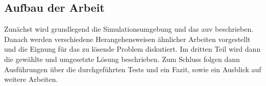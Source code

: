 \subsection{Aufbau der Arbeit}
Zunächst wird grundlegend die Simulationsumgebung und das \gls{auv} beschrieben. Danach werden verschiedene Herangehensweisen ähnlicher Arbeiten vorgestellt und die Eignung für das zu lösende Problem diskutiert.
Im dritten Teil wird dann die gewählte und umgesetzte Lösung beschrieben. Zum Schluss folgen dann Ausführungen über die durchgeführten Tests und ein Fazit, sowie ein Ausblick auf weitere Arbeiten.